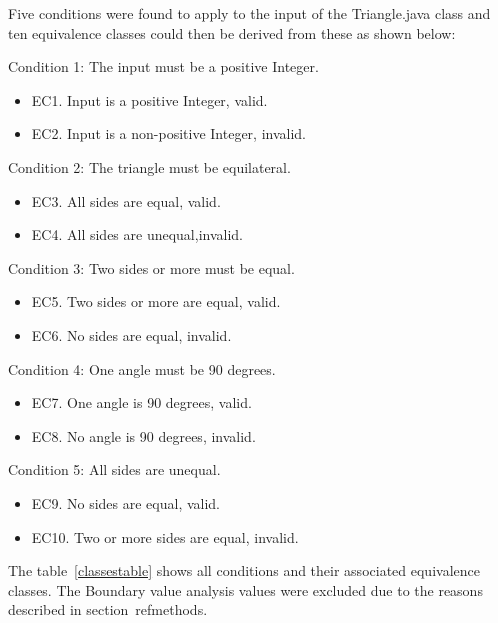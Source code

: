 Five conditions were found to apply to the input of the Triangle.java class and ten equivalence classes could then be derived from these as shown below:

\noindent Condition 1: The input must be a positive Integer.
\begin{itemize}
	\item EC1. Input is a positive Integer, valid.
	\item EC2. Input is a non-positive Integer, invalid.
\end{itemize}

\noindent Condition 2: The triangle must be equilateral.
\begin{itemize}
	\item EC3. All sides are equal, valid. 
	\item EC4. All sides are unequal,invalid. 
\end{itemize}

\noindent Condition 3: Two sides or more must be equal.  
\begin{itemize}
	\item EC5. Two sides or more are equal, valid. 
	\item EC6. No sides are equal, invalid. 
\end{itemize}

\noindent Condition 4: One angle must be 90 degrees. 
\begin{itemize}
	\item EC7. One angle is 90 degrees, valid. 
	\item EC8. No angle is 90 degrees, invalid. 
\end{itemize}

\noindent Condition 5: All sides are unequal. 
\begin{itemize}
	\item EC9. No sides are equal, valid. 
	\item EC10. Two or more sides are equal, invalid. 
\end{itemize}

The table~\ref{classestable} shows all conditions and their associated equivalence classes. The Boundary value analysis values were excluded due to the reasons described in section~ref{methods}. 


